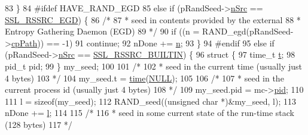 \begin{DoxyCode}
83             \}
84 \textcolor{preprocessor}{#ifdef HAVE\_RAND\_EGD}
85             \textcolor{keywordflow}{else} \textcolor{keywordflow}{if} (pRandSeed->\hyperlink{structssl__randseed__t_af1d3a2bb8da081095e00edb1a2362e75}{nSrc} == \hyperlink{group__MOD__SSL__PRIVATE_gga950679a8e8bb92658a71bcfdb304390fa8a1014cb72fa220f749905970e32f5d2}{SSL\_RSSRC\_EGD}) \{
86                 \textcolor{comment}{/*}
87 \textcolor{comment}{                 * seed in contents provided by the external}
88 \textcolor{comment}{                 * Entropy Gathering Daemon (EGD)}
89 \textcolor{comment}{                 */}
90                 \textcolor{keywordflow}{if} ((n = RAND\_egd(pRandSeed->\hyperlink{structssl__randseed__t_a609e0b7b2a35df6e73aab906e1ca8b34}{cpPath})) == -1)
91                     \textcolor{keywordflow}{continue};
92                 nDone += \hyperlink{group__APACHE__CORE__PROTO_gad484edfd58b9127caa8f0f59b4004d09}{n};
93             \}
94 \textcolor{preprocessor}{#endif}
95             \textcolor{keywordflow}{else} \textcolor{keywordflow}{if} (pRandSeed->\hyperlink{structssl__randseed__t_af1d3a2bb8da081095e00edb1a2362e75}{nSrc} == \hyperlink{group__MOD__SSL__PRIVATE_gga950679a8e8bb92658a71bcfdb304390fa8c20f943ba387041091dbae648b1d3d6}{SSL\_RSSRC\_BUILTIN}) \{
96                 \textcolor{keyword}{struct }\{
97                     time\_t \hyperlink{group__APACHE__CORE__DAEMON_gabfa74bb4f05f3b2de1a89160025e5400}{t};
98                     pid\_t pid;
99                 \} my\_seed;
100 
101                 \textcolor{comment}{/*}
102 \textcolor{comment}{                 * seed in the current time (usually just 4 bytes)}
103 \textcolor{comment}{                 */}
104                 my\_seed.t = \hyperlink{pcre_8txt_aafdc0b2481cb13eb2e0183db31aa1c5d}{time}(\hyperlink{pcre_8txt_ad7f989d16aa8ca809a36bc392c07fba1}{NULL});
105 
106                 \textcolor{comment}{/*}
107 \textcolor{comment}{                 * seed in the current process id (usually just 4 bytes)}
108 \textcolor{comment}{                 */}
109                 my\_seed.pid = mc->\hyperlink{structSSLModConfigRec_a502680db48a6c7c3c15f880873fae223}{pid};
110 
111                 l = \textcolor{keyword}{sizeof}(my\_seed);
112                 RAND\_seed((\textcolor{keywordtype}{unsigned} \textcolor{keywordtype}{char} *)&my\_seed, l);
113                 nDone += \hyperlink{group__APACHE__CORE__CONFIG_ga325499caccf210ef36b605bae60930b7}{l};
114 
115                 \textcolor{comment}{/*}
116 \textcolor{comment}{                 * seed in some current state of the run-time stack (128 bytes)}
117 \textcolor{comment}{                 */}

\end{DoxyCode}
